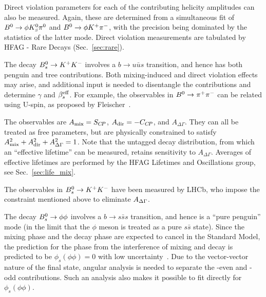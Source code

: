Direct \CP violation parameters for each of the contributing helicity
amplitudes can also be measured. Again, these are determined from a
simultaneous fit of $B^0 \to \phi K^0_{\scriptscriptstyle S} \pi^0$ and $B^0 \to \phi K^+ \pi^-$,
with the precision being dominated by the statistics of the latter
mode. Direct \CP violation measurements are tabulated by HFAG - Rare Decays 
(Sec.~\ref{sec:rare}). 

\label{sec:cp_uta:qqs:BstoKK}

The decay $B^0_s \to K^+K^-$ involves a $b \to u\bar{u}s$ transition, and hence has both penguin and tree contributions. Both mixing-induced and direct \CP violation effects may arise, and additional input is needed to disentangle the contributions and determine $\gamma$ and $\beta_s^{\rm eff}$. For example, the observables in $B^0 \to \pi^+\pi^-$ can be related using U-spin, as proposed by Fleischer~\cite{Fleischer:1999pa}.

The observables are $A_{\rm mix} = S_{C\!P}$, $A_{\rm dir} = -C_{C\!P}$, and $A_{\Delta\Gamma}$. They can all be treated as free parameters, but are physically constrained to satisfy $A_{\rm mix}^2 + A_{\rm dir}^2 + A_{\Delta\Gamma}^2 = 1$. Note that the untagged decay distribution, from which an ``effective lifetime'' can be measured, retains sensitivity to $A_{\Delta\Gamma}$. Averages of effective lifetimes are performed by the HFAG Lifetimes and Oscillations group, see Sec.~\ref{sec:life_mix}.

The observables in $B^0_s \to K^+K^-$ have been measured by LHCb, who impose the constraint mentioned above to eliminate $A_{\rm \Delta\Gamma}$. 



\label{sec:cp_uta:qqs:Bstophiphi}

 The decay $B^0_s \to \phi\phi$ involves a $b \to s\bar{s}s$ transition, and hence is a ``pure penguin'' mode (in the limit that the $\phi$ meson is treated as a pure $s\bar{s}$ state). Since the mixing phase and the decay phase are expected to cancel in the Standard Model, the prediction for the phase from the interference of mixing and decay is predicted to be $\phi_s(\phi\phi) = 0$ with low uncertainty~\cite{Raidal:2002ph}. Due to the vector-vector nature of the final state, angular analysis is needed to separate the \CP-even and \CP-odd contributions. Such an analysis also makes it possible to fit directly for $\phi_s(\phi\phi)$.

